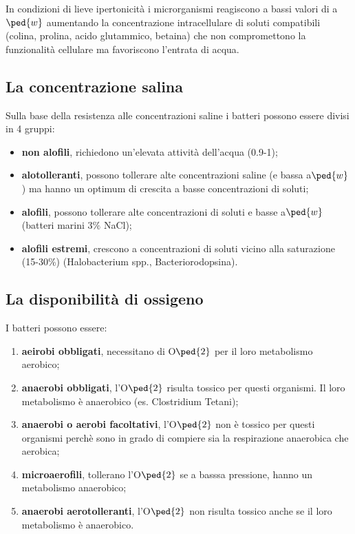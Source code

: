 \documentclass[11pt]{book}
\begin{document}
In condizioni di lieve ipertonicità i microrganismi reagiscono a bassi valori di a$\ped{w}$ aumentando la concentrazione intracellulare di soluti compatibili (colina, prolina, acido glutammico, betaina) che non compromettono la funzionalità cellulare ma favoriscono l’entrata di acqua.

\subsection{La concentrazione salina}
Sulla base della resistenza alle concentrazioni saline i batteri possono essere divisi in 4 gruppi:
\begin{itemize}
\item \textbf{non alofili}, richiedono un'elevata attività dell’acqua (0.9-1);
\item \textbf{alotolleranti}, possono tollerare alte concentrazioni saline (e bassa a$\ped{w}$) ma hanno un optimum di crescita a basse concentrazioni di soluti;
\item \textbf{alofili}, possono tollerare alte concentrazioni di soluti e basse a$\ped{w}$ (batteri marini 3$\%$ NaCl);
\item \textbf{alofili estremi}, crescono a concentrazioni di soluti vicino alla saturazione (15-30$\%$) (Halobacterium spp., Bacteriorodopsina).
\end{itemize}

\subsection{La disponibilità di ossigeno}
I batteri possono essere:
\begin{enumerate}
\item  \textbf{aeirobi obbligati}, necessitano di O$\ped{2}$ per il loro metabolismo aerobico;
\item \textbf{anaerobi obbligati}, l'O$\ped{2}$ risulta tossico per questi organismi. Il loro metabolismo è anaerobico (es. Clostridium Tetani);
\item \textbf{anaerobi o aerobi facoltativi}, l'O$\ped{2}$ non è tossico per questi organismi perchè sono in grado di compiere sia la respirazione anaerobica che aerobica;
\item \textbf{microaerofili}, tollerano l'O$\ped{2}$ se a basssa pressione, hanno un metabolismo anaerobico;
\item \textbf{anaerobi aerotolleranti}, l'O$\ped{2}$ non risulta tossico anche se il loro metabolismo è anaerobico.
\end{enumerate}
\end{document}
